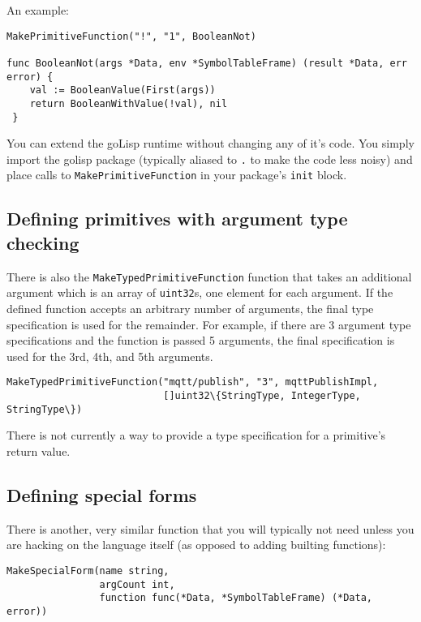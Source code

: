 \documentclass{article}
\begin{document}
An example:

\begin{verbatim}
MakePrimitiveFunction("!", "1", BooleanNot)

func BooleanNot(args *Data, env *SymbolTableFrame) (result *Data, err error) {
    val := BooleanValue(First(args))
    return BooleanWithValue(!val), nil
 }
\end{verbatim}

You can extend the goLisp runtime without changing any of it's code. You simply import the
golisp package (typically aliased to \verb|.| to make the code less noisy) and place calls
to \verb|MakePrimitiveFunction| in your package's \verb|init| block.

\subsection{Defining primitives with argument type checking}\label{sec:defining-primitives-with-argument-type-checking}

There is also the \verb|MakeTypedPrimitiveFunction| function that takes an additional
argument which is an array of \verb|uint32|s, one element for each argument. If the defined
function accepts an arbitrary number of arguments, the final type specification is used for
the remainder. For example, if there are 3 argument type specifications and the function is
passed 5 arguments, the final specification is used for the 3rd, 4th, and 5th arguments.

\begin{verbatim}
MakeTypedPrimitiveFunction("mqtt/publish", "3", mqttPublishImpl, 
                           []uint32\{StringType, IntegerType, StringType\})
\end{verbatim}

There is not currently a way to provide a type specification for a primitive's return value.

\subsection{Defining special forms}\label{sec:defining-special-forms}

There is another, very similar function that you will typically not need unless you are
hacking on the language itself (as opposed to adding builting functions):

\begin{verbatim}
MakeSpecialForm(name string,
                argCount int,
                function func(*Data, *SymbolTableFrame) (*Data, error))
\end{verbatim}
\end{document}

